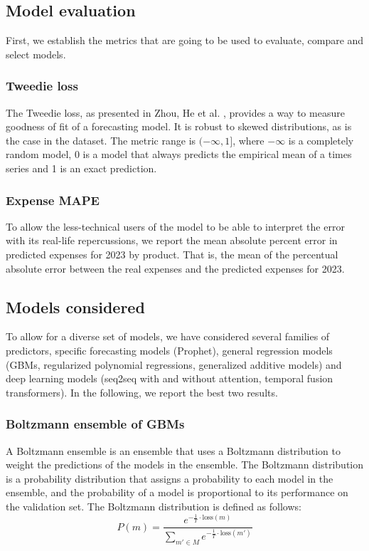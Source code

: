 \documentclass[11pt,twocolumn]{article}
\begin{document}
\subsection{Model evaluation}
First, we establish the metrics that are going to be used to evaluate, compare and select models.

\subsubsection{Tweedie loss}
The Tweedie loss, as presented in Zhou, He et al. \cite{key5}, provides a way to measure goodness of fit of a forecasting model. It is robust to skewed distributions, as is the case in the dataset. The metric range is $(-\infty, 1]$, where $-\infty$ is a completely random model, 0 is a model that always predicts the empirical mean of a times series and 1 is an exact prediction.

\subsubsection{Expense MAPE}
To allow the less-technical users of the model to be able to interpret the error with its real-life repercussions, we report the mean absolute percent error in predicted expenses for 2023 by product. That is, the mean of the percentual absolute error between the real expenses and the predicted expenses for 2023.

\subsection{Models considered}
To allow for a diverse set of models, we have considered several families of predictors, specific forecasting models (Prophet), general regression models (GBMs, regularized polynomial regressions, generalized additive models) and deep learning models (seq2seq with and without attention, temporal fusion transformers). In the following, we report the best two results.

\subsubsection{Boltzmann ensemble of GBMs}
A Boltzmann ensemble is an ensemble that uses a Boltzmann distribution to weight the predictions of the models in the ensemble. The Boltzmann distribution is a probability distribution that assigns a probability to each model in the ensemble, and the probability of a model is proportional to its performance on the validation set. The Boltzmann distribution is defined as follows:
\begin{equation*}
	P\left( m \right) = \frac{e^{-\frac{1}{T} \cdot \text{loss}\left( m \right) }}{\sum_{m' \in M}^{} e^{-\frac{1}{T} \cdot \text{loss}\left( m' \right) }}
\end{equation*}
\end{document}
